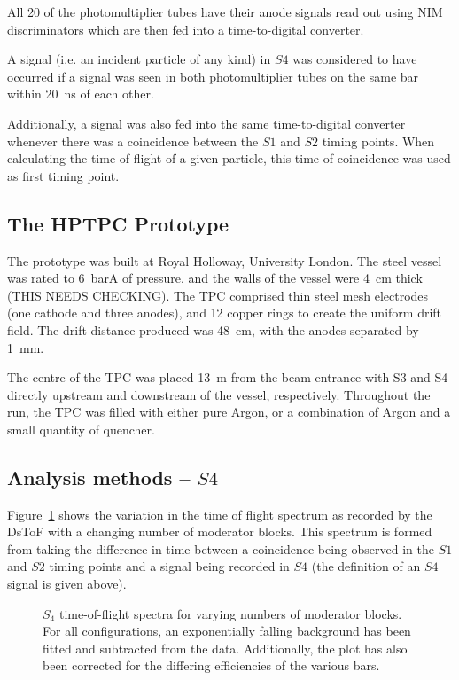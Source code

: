     All 20 of the photomultiplier tubes have their anode signals read out using NIM discriminators which are then fed into a time-to-digital converter. 
    
    A signal (i.e. an incident particle of any kind) in $S4$ was considered to have occurred if a signal was seen in both photomultiplier tubes on the same bar within 20~ns of each other.
    
    Additionally, a signal was also fed into the same time-to-digital converter whenever there was a coincidence between the $S1$ and $S2$ timing points. 
    When calculating the time of flight of a given particle, this time of coincidence was used as first timing point.
    
    \subsection{The HPTPC Prototype}
    The prototype was built at Royal Holloway, University London.
    The steel vessel was rated to 6~barA of pressure, and the walls of the vessel were 4~cm thick (THIS NEEDS CHECKING).
    The TPC comprised thin steel mesh electrodes (one cathode and three anodes), and 12 copper rings to create the uniform drift field.
    The drift distance produced was 48~cm, with the anodes separated by 1~mm.
    
    The centre of the TPC was placed 13~m from the beam entrance with S3 and S4 directly upstream and downstream of the vessel, respectively.
    Throughout the run, the TPC was filled with either pure Argon, or a combination of Argon and a small quantity of quencher.
    
	\subsection{Analysis methods -- $S4$}

	Figure~\ref{fig:s4tof} shows the variation in the time of flight spectrum as recorded by the DsToF with a changing number of moderator blocks. 
	This spectrum is formed from taking the difference in time between a coincidence being observed in the $S1$ and $S2$ timing points and a signal being recorded in $S4$ (the definition of an $S4$ signal is given above).
	
	\begin{figure}[h]
		\begin{adjustbox}{max totalsize={.8\textwidth}{.7\textheight},center}
			
		\end{adjustbox}
		\caption{$S_{4}$ time-of-flight spectra for varying numbers of moderator blocks. For all configurations, an exponentially falling background has been fitted and subtracted from the data. Additionally, the plot has also been corrected for the differing efficiencies of the various bars.}
		\label{fig:s4tof}	
	\end{figure}

